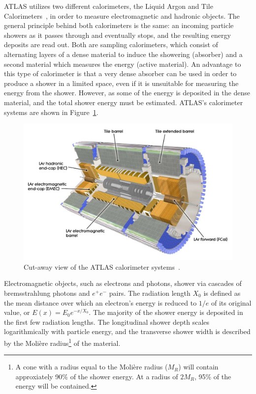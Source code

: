 ﻿ATLAS utilizes two different calorimeters, the Liquid Argon and Tile Calorimeters~\cite{1996.lar-tdr, 1996.tilecal-tdr}, in order to measure electromagnetic and hadronic objects.
The general principle behind both calorimeters is the same: an incoming particle showers as it passes through and eventually stops, and the resulting energy deposits are read out.
Both are sampling calorimeters, which consist of alternating layers of a dense material to induce the showering (absorber) and a second material which measures the energy (active material).
An advantage to this type of calorimeter is that a very dense absorber can be used in order to produce a shower in a limited space, even if it is unsuitable for measuring the energy from the shower.
However, as some of the energy is deposited in the dense material, and the total shower energy must be estimated.
ATLAS's calorimeter systems are shown in Figure~\ref{fig:calorimeters}.

\begin{figure}[htbp]
  \centering
  \includegraphics[width=.8\textwidth]{figs/detector/calorimeter}
  \caption[Cut-away view of the ATLAS calorimeter systems.]{Cut-away view of the ATLAS calorimeter systems~\cite{2018.tilecal}.}
  \label{fig:calorimeters}
\end{figure}

Electromagnetic objects, such as electrons and photons, shower via cascades of bremsstrahlung photons and $e^+ e^-$ pairs.
The radiation length $X_0$ is defined as the mean distance over which an electron's energy is reduced to $1/e$ of its original value, or $E(x) = E_{0}e^{-x/X_0}$.
The majority of the shower energy is deposited in the first few radiation lengths.
The longitudinal shower depth scales logarithmically with particle energy, and the transverse shower width is described by the Moli\`{e}re radius\footnote{A cone with a radius equal to the Moli\`{e}re radius ($M_R$) will contain approxiately 90\% of the shower energy.  At a radius of $2M_R$, 95\% of the energy will be contained.} of the material.

